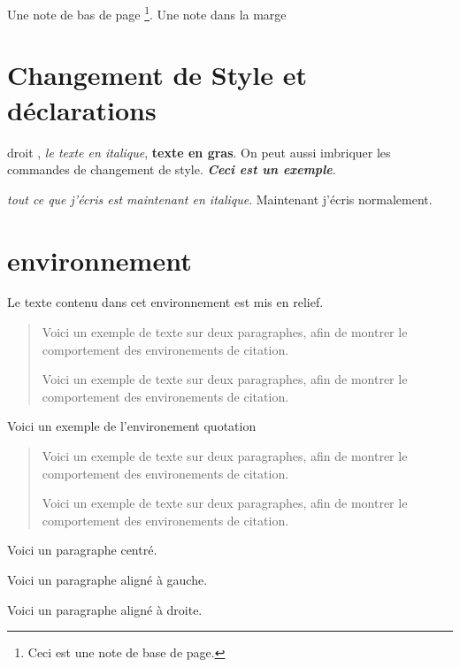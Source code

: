 \documentclass[a4paper,11pt]{article}
\begin{document}
Une note de bas de page \footnote{Ceci est une note de base de page.}.
Une note dans la marge 

\section{Changement de Style et déclarations}

\textup{droit} , \textit{le texte en italique}, \textbf{texte en gras}.
On peut aussi imbriquer les commandes de changement de style. \textit{\textbf{Ceci est un exemple}}.

{\itshape tout ce que j'écris est maintenant en italique}. Maintenant j'écris normalement.

\section{environnement}

\begin{em}
Le texte contenu dans cet environnement est mis en relief.
\end{em}

\begin{quote}
Voici un exemple de texte sur deux paragraphes, afin de montrer le comportement des environements de citation.

Voici un exemple de texte sur deux paragraphes, afin de montrer le comportement des environements de citation.
\end{quote}

Voici un exemple de l'environement quotation


\begin{quotation}
Voici un exemple de texte sur deux paragraphes, afin de montrer le comportement des environements de citation.

Voici un exemple de texte sur deux paragraphes, afin de montrer le comportement des environements de citation.
\end{quotation}

\begin{center}
Voici un paragraphe centré.
\end{center}

\begin{flushleft}
Voici un paragraphe aligné à gauche.
\end{flushleft}

\begin{flushright}
Voici un paragraphe aligné à droite.
\end{flushright}
\end{document}
